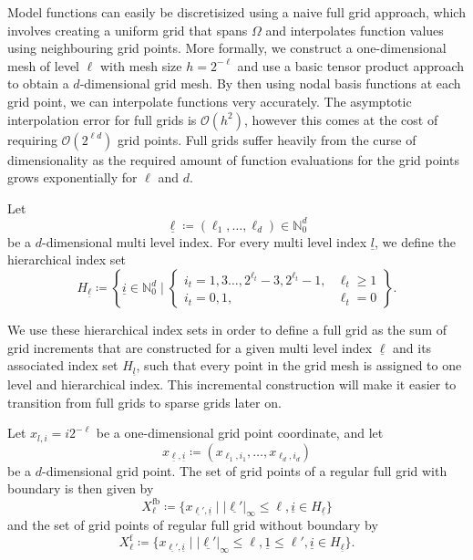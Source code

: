\documentclass[
  a4paper,  %
  twoside,  %
  bibliography=totoc,
  headsepline,
  cleardoublepage=empty,
  parskip=half,
  draft=false
]{scrbook}
\begin{document}
Model functions can easily be discretisized using a naive full grid approach, which involves creating a uniform grid that spans $\Omega$ and interpolates function values using neighbouring grid points.
More formally, we construct a one-dimensional mesh of level $\ell$ with mesh size $h=2^{-\ell}$ and use a basic tensor product approach to obtain a $d$-dimensional grid mesh.
By then using nodal basis functions at each grid point, we can interpolate functions very accurately.
The asymptotic interpolation error for full grids is $\mathcal{O}(h^2)$, however this comes at the cost of requiring $\mathcal{O}(2^{\ell d})$ grid points.
Full grids suffer heavily from the curse of dimensionality as the required amount of function evaluations for the grid points grows exponentially for $\ell$ and $d$.
\begin{definition}
Let
\begin{equation}
\underline{\ell} \coloneqq (\ell_1, \dots, \ell_d) \in \mathds{N}_0^d
\end{equation}
be a $d$-dimensional multi level index. For every multi level index $\underline{l}$, we define the hierarchical index set
\begin{equation}
H_{\underline{\ell}} \coloneqq \left\{ \underline{i} \in \mathds{N}^d_0 \mid
\begin{cases}
    i_t=1,3\dots,2^{\ell_t} - 3, 2^{\ell_t} - 1, & \ell_t \geq 1 \\
    i_t=0,1, & \ell_t = 0
\end{cases} \right\}.
\end{equation}
\end{definition}

We use these hierarchical index sets in order to define a full grid as the sum of grid increments that are constructed for a given multi level index $\underline{\ell}$ and its associated index set $H_{\underline{l}}$, such that every point in the grid mesh is assigned to one level and hierarchical index.
This incremental construction will make it easier to transition from full grids to sparse grids later on.
\begin{definition}
Let $x_{l,i}=i2^{-\ell}$ be a one-dimensional grid point coordinate, and let
\begin{equation}
x_{\underline{\ell},\underline{i}} \coloneqq (x_{\ell_1,i_1}, \dots, x_{\ell_d,i_d})
\end{equation}
be a $d$-dimensional grid point. The set of grid points of a regular full grid with boundary is then given by
\begin{equation}
X^{\text{fb}}_{\ell} \coloneqq \{x_{\underline{\ell'},\underline{i}} \mid |\underline{\ell'}|_{\infty} \leq \ell, \underline{i} \in H_{\underline{\ell}}\}
\end{equation}
and the set of grid points of regular full grid without boundary by
\begin{equation}
X^{\text{f}}_{\ell} \coloneqq \{x_{\underline{\ell'},\underline{i}} \mid |\underline{\ell'}|_{\infty} \leq \ell, \underline{1} \leq \ell',  \underline{i} \in H_{\underline{\ell}}\}.
\end{equation}
\end{definition}
\end{document}
